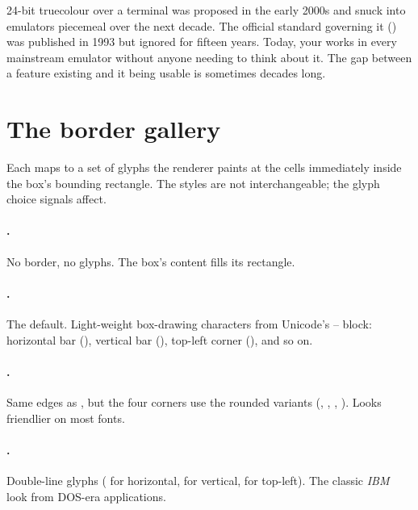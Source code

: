 \begin{funfact}
24-bit truecolour over a terminal was proposed in the early 2000s
and snuck into emulators piecemeal over the next decade. The
official standard governing it () was published
in 1993 but ignored for fifteen years. Today, your
\code{printf '\textbackslash{}e[38;2;255;128;0mhi'} works in every
mainstream emulator without anyone needing to think about it. The
gap between a feature existing and it being usable is sometimes
decades long.
\end{funfact}

\section{The border gallery}
\label{sec:elem:border-gallery}

Each  maps to a set of glyphs the renderer paints
at the cells immediately inside the box's bounding rectangle. The
styles are not interchangeable; the glyph choice signals affect.

\paragraph{.} No border, no glyphs. The box's content
fills its rectangle.

\paragraph{.} The default. Light-weight box-drawing
characters from Unicode's -- block:
horizontal bar (), vertical bar (),
top-left corner (), and so on.

\paragraph{.} Same edges as , but the four
corners use the rounded variants (, ,
, ). Looks friendlier on most fonts.

\paragraph{.} Double-line glyphs ( for
horizontal,  for vertical,  for top-left).
The classic \emph{IBM} look from DOS-era applications.

